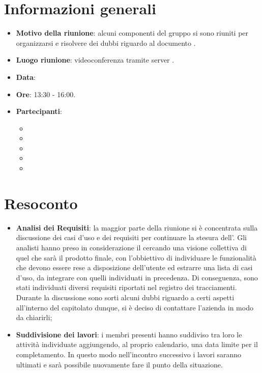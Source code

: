 \section{Informazioni generali}
\begin{itemize}
\item \textbf{Motivo della riunione}: alcuni componenti del gruppo si sono riuniti per organizzarsi e risolvere dei dubbi riguardo al documento \AdR.
\item \textbf{Luogo riunione}: videoconferenza tramite server .
\item \textbf{Data}: \Data{}
\item \textbf{Ore}: 13:30 - 16:00.
\item \textbf{Partecipanti}:
	\begin{itemize}
	\item \BM{}
	\item \SG{}
	\item \SP{}
	\item \SH{}
	\item \PA{}
	\end{itemize}
\end{itemize}
\newpage
\section{Resoconto}
\begin{itemize}
\item \textbf{Analisi dei Requisiti}: la maggior parte della riunione si è concentrata sulla discussione dei casi d'uso e dei requisiti per continuare la stesura dell'\AdRv{}.
Gli analisti hanno preso in considerazione il  cercando una visione collettiva di quel che sarà il prodotto finale, con l'obbiettivo di individuare le funzionalità che devono essere rese a disposizione dell'utente ed estrarre una lista di casi d'uso, da integrare con quelli individuati in precedenza. Di conseguenza, sono stati individuati diversi requisiti riportati nel registro dei tracciamenti.\\
Durante la discussione sono sorti alcuni dubbi riguardo a certi aspetti all'interno del capitolato dunque, si è deciso di contattare l'azienda in modo da chiarirli;

\item \textbf{Suddivisione dei lavori}: i membri presenti hanno suddiviso tra loro le attività individuate aggiungendo, al proprio calendario, una data limite per il completamento. In questo modo nell'incontro successivo i lavori saranno ultimati e sarà possibile nuovamente fare il punto della situazione.

\end{itemize}

 
